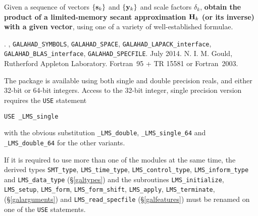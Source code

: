 \documentclass{galahad}
\newcommand{\packagename}{LMS}
\newcommand{\fullpackagename}{\libraryname\_\packagename}
\begin{document}
\galheader


\galsummary
Given a sequence of vectors $\{{\mathbf{s}}_k\}$ and $\{{\mathbf{y}}_k\}$ and scale factors
$\delta_k$, {\bf obtain the product of a limited-memory secant approximation
${\mathbf{H}}_k$ (or its inverse) with a given vector}, using one of a variety of
well-established formulae.


\galattributes
\galversions{\tt  \fullpackagename\_single, \fullpackagename\_double}.
,
{\tt GALAHAD\_\-SY\-M\-BOLS},
{\tt GALAHAD\-\_SPACE},
{\tt GALAHAD\_LAPACK\_interface},
{\tt GALAHAD\_BLAS\_interface},
{\tt GALAHAD\_SPECFILE}.
\galdate July 2014.
\galorigin N. I. M. Gould,
Rutherford Appleton Laboratory.
\gallanguage Fortran~95 + TR 15581 or Fortran~2003.


\galhowto

The package is available using both single and double precision reals, 
and either 32-bit or 64-bit integers. Access to the 32-bit integer,
single precision version requires the {\tt USE} statement
\medskip

\hspace{8mm} {\tt USE \fullpackagename\_single}

\medskip
\noindent
with the obvious substitution {\tt \fullpackagename\_double},
{\tt \fullpackagename\_single\_64} and 
{\tt \fullpackagename\_double\_64} for the other variants.

\noindent
If it is required to use more than one of the modules at the same time, 
the derived types
{\tt SMT\_type},
{\tt \packagename\_time\_type},
{\tt \packagename\_control\_type},
{\tt \packagename\_inform\_type}
and
{\tt \packagename\_data\_type}
(\S\ref{galtypes})
and the subroutines
{\tt \packagename\_initialize},
{\tt \packagename\_\-setup},
{\tt \packagename\_\-form},
{\tt \packagename\_\-form\_shift},
{\tt \packagename\_\-apply},
{\tt \packagename\_terminate},
(\S\ref{galarguments})
and
{\tt \packagename\_read\_specfile}
(\S\ref{galfeatures})
must be renamed on one of the {\tt USE} statements.



\end{document}
